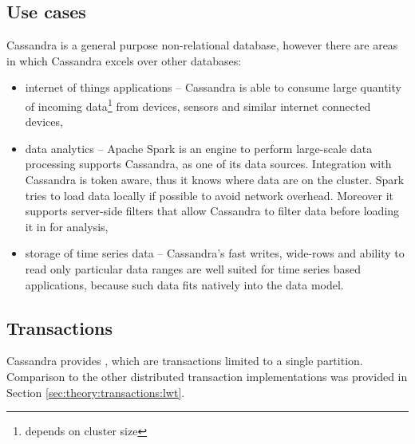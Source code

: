  
\subsection{Use cases}
Cassandra is a general purpose non-relational database, however there are areas in which Cassandra excels over other databases:
\begin{itemize}
\item internet of things applications -- Cassandra is able to consume large quantity of incoming data\footnote{depends on cluster size} from devices, sensors and similar internet connected devices,
\item data analytics -- Apache Spark is an engine to perform large-scale data processing \cite{ApacheSpark} supports Cassandra, as one of its data sources.
Integration with Cassandra is token aware, thus it knows where data are on the cluster. Spark tries to load data locally if possible to avoid network overhead. Moreover it supports server-side filters that allow Cassandra to filter data before loading it in for analysis,
\item storage of time series data -- Cassandra's fast writes, wide-rows and ability to read only particular data ranges are well suited for time series based applications, because such data fits natively into the data model.
\end{itemize} 

\subsection{Transactions}
Cassandra provides \lwt, which are transactions limited to a single partition.
Comparison to the other distributed transaction implementations was provided in Section \ref{sec:theory:transactions:lwt}.

